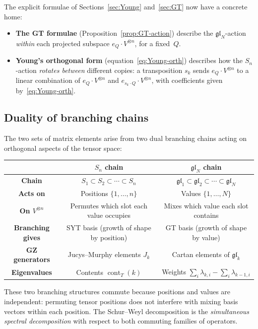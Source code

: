 \documentclass[12pt,a4paper]{article}
\theoremstyle{definition}
\theoremstyle{remark}
\newcommand{\gl}{\mathfrak{gl}}
\newcommand{\cont}{\operatorname{cont}}
\begin{document}
The explicit formulae of Sections~\ref{sec:Young} and~\ref{sec:GT}
now have a concrete home:
\begin{itemize}
\item \textbf{The GT formulae} (Proposition~\ref{prop:GT-action})
  describe the $\gl_N$-action \emph{within} each projected subspace
  $e_Q \cdot V^{\otimes n}$, for a fixed~$Q$.
\item \textbf{Young's orthogonal form}
  (equation~\eqref{eq:Young-orth}) describes how the $S_n$-action
  \emph{rotates between} different copies: a transposition $s_k$
  sends $e_Q \cdot V^{\otimes n}$ to a linear combination of
  $e_Q \cdot V^{\otimes n}$ and $e_{s_k \cdot Q} \cdot V^{\otimes n}$,
  with coefficients given by~\eqref{eq:Young-orth}.
\end{itemize}

\subsection{Duality of branching chains}

The two sets of matrix elements arise from two dual branching chains
acting on orthogonal aspects of the tensor space:

\begin{center}
\renewcommand{\arraystretch}{1.4}
\begin{tabular}{c|c|c}
  & \textbf{$S_n$ chain} & \textbf{$\gl_N$ chain} \\
\hline
\textbf{Chain}
  & $S_1 \subset S_2 \subset \cdots \subset S_n$
  & $\gl_1 \subset \gl_2 \subset \cdots \subset \gl_N$ \\
\textbf{Acts on}
  & Positions $\{1, \ldots, n\}$
  & Values $\{1, \ldots, N\}$ \\
\textbf{On $V^{\otimes n}$}
  & Permutes which slot each value occupies
  & Mixes which value each slot contains \\
\textbf{Branching gives}
  & SYT basis (growth of shape by position)
  & GT basis (growth of shape by value) \\
\textbf{GZ generators}
  & Jucys--Murphy elements $J_k$
  & Cartan elements of $\gl_k$ \\
\textbf{Eigenvalues}
  & Contents $\cont_T(k)$
  & Weights $\textstyle\sum_i \lambda_{k,i} - \sum_i \lambda_{k-1,i}$
\end{tabular}
\end{center}

These two branching structures commute because positions and values
are independent: permuting tensor positions does not interfere with
mixing basis vectors within each position. The Schur--Weyl
decomposition is the \emph{simultaneous spectral decomposition} with
respect to both commuting families of operators.
\end{document}
